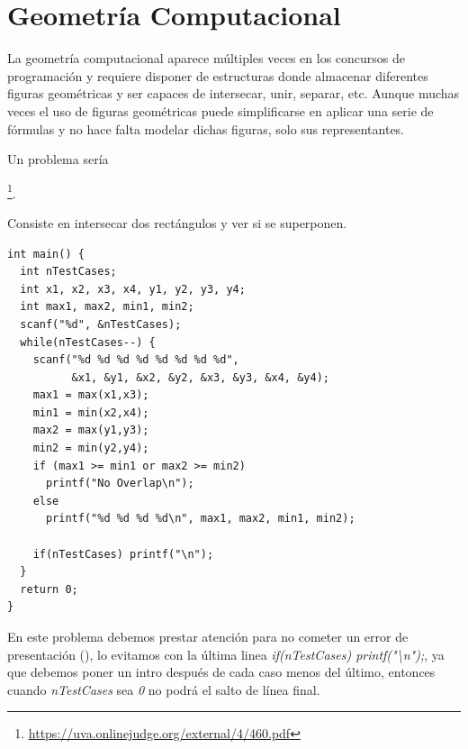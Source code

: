 \section{Geometría Computacional}
\label{sec:geometria}

La geometría computacional aparece múltiples veces en los concursos de
programación y requiere disponer de estructuras donde almacenar
diferentes figuras geométricas y ser capaces de intersecar, unir,
separar, etc. Aunque muchas veces el uso de figuras geométricas puede
simplificarse en aplicar una serie de fórmulas y no hace falta modelar
dichas figuras, solo sus representantes.

Un problema sería 

\footnote{\url{https://uva.onlinejudge.org/external/4/460.pdf}}.

Consiste en intersecar dos rectángulos y ver si se superponen.

\begin{lstlisting}
int main() {
  int nTestCases;
  int x1, x2, x3, x4, y1, y2, y3, y4;
  int max1, max2, min1, min2;
  scanf("%d", &nTestCases);
  while(nTestCases--) {
    scanf("%d %d %d %d %d %d %d %d", 
          &x1, &y1, &x2, &y2, &x3, &y3, &x4, &y4);
    max1 = max(x1,x3);
    min1 = min(x2,x4);
    max2 = max(y1,y3);
    min2 = min(y2,y4);    
    if (max1 >= min1 or max2 >= min2) 
      printf("No Overlap\n");
    else 
      printf("%d %d %d %d\n", max1, max2, min1, min2);
    
    if(nTestCases) printf("\n");
  }
  return 0;
}
\end{lstlisting}

En este problema debemos prestar atención para no cometer un error de
presentación (), lo evitamos con la última linea
\emph{if(nTestCases) printf("\textbackslash{}n");}, ya que debemos poner un intro
después de cada caso menos del último, entonces cuando
\emph{nTestCases} sea \emph{0} no podrá el salto de línea final.

